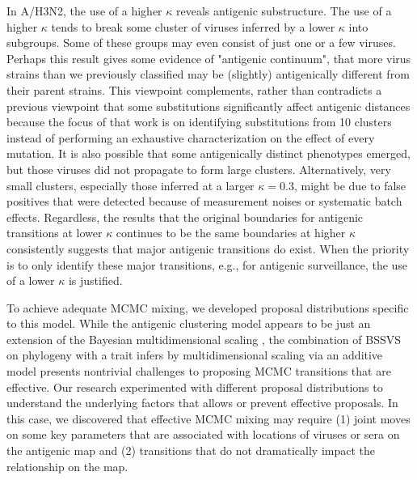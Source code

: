 \documentclass[11pt,oneside,letterpaper]{article}
\begin{document}
In A/H3N2, the use of a higher $\kappa$ reveals antigenic substructure. 
The use of a higher $\kappa$ tends to break some cluster of viruses inferred by a lower $\kappa$ into subgroups. 
Some of these groups may even consist of just one or a few viruses. 
Perhaps this result gives some evidence of "antigenic continuum", that more virus strains than we previously classified may be (slightly) antigenically different from their parent strains. 
This viewpoint complements, rather than contradicts a previous viewpoint that some substitutions significantly affect antigenic distances \cite{koel_substitutions_2013} because the focus of that work is on identifying substitutions from 10 clusters instead of performing an exhaustive characterization on the effect of every mutation. 
It is also possible that some antigenically distinct phenotypes emerged, but those viruses did not propagate to form large clusters.
Alternatively, very small clusters, especially those inferred at a larger $\kappa=0.3$, might be due to false positives that were detected because of measurement noises or systematic batch effects.
Regardless, the results that the original boundaries for antigenic transitions at lower $\kappa$ continues to be the same boundaries at higher $\kappa$ consistently suggests that major antigenic transitions do exist. 
When the priority is to only identify these major transitions, e.g., for antigenic surveillance, the use of a lower $\kappa$ is justified.  


To achieve adequate MCMC mixing, we developed proposal distributions specific to this model. 
While the antigenic clustering model appears to be just an extension of the Bayesian multidimensional scaling \cite{bedford_integrating_2014}, the combination of BSSVS on phylogeny with a trait infers by multidimensional scaling via an additive model presents nontrivial challenges to proposing MCMC transitions that are effective. 
Our research experimented with different proposal distributions to understand the underlying factors that allows or prevent effective proposals. 
In this case, we discovered that effective MCMC mixing may require (1) joint moves on some key parameters that are associated with locations of viruses or sera on the antigenic map and (2) transitions that do not dramatically impact the relationship on the map.
\end{document}

